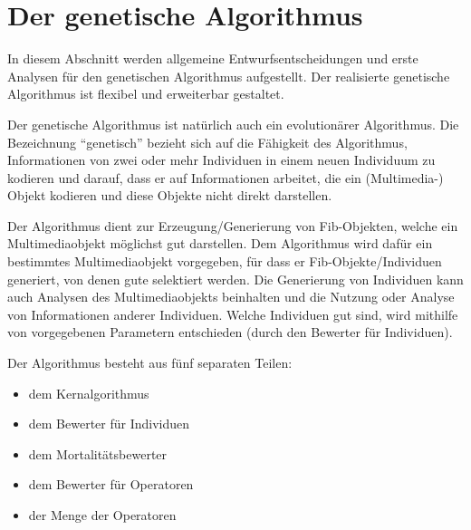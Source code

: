 %
%
%
%

\graphicspath{{./material_enviroment/}}
\graphicspath{{./material_enviroment/}{../material_enviroment}}

\newpage
\part{Der genetische Algorithmus}
\label{secGeneticAlgorithmDesign}

In diesem Abschnitt werden allgemeine Entwurfsentscheidungen und erste Analysen für den genetischen Algorithmus aufgestellt.
Der realisierte genetische Algorithmus ist flexibel und erweiterbar gestaltet.

Der genetische Algorithmus ist natürlich auch ein evolutionärer Algorithmus. Die Bezeichnung ``genetisch'' bezieht sich auf die Fähigkeit des Algorithmus, Informationen von zwei oder mehr Individuen in einem neuen Individuum zu kodieren und darauf, dass er auf Informationen arbeitet, die ein (Multimedia-) Objekt kodieren und diese Objekte nicht direkt darstellen.

Der Algorithmus dient zur Erzeugung/Generierung von Fib-Objekten, welche ein Multimediaobjekt möglichst gut darstellen. Dem Algorithmus wird dafür ein bestimmtes Multimediaobjekt vorgegeben, für dass er Fib-Objekte/Individuen generiert, von denen gute selektiert werden. Die Generierung von Individuen kann auch Analysen des Multimediaobjekts beinhalten und die Nutzung oder Analyse von Informationen anderer Individuen. Welche Individuen gut sind, wird mithilfe von vorgegebenen Parametern entschieden (durch den Bewerter für Individuen).

\bigskip\noindent
Der Algorithmus besteht aus fünf separaten Teilen:
\begin{itemize}
 \item dem Kernalgorithmus
 \item dem Bewerter für Individuen
 \item dem Mortalitätsbewerter
 \item dem Bewerter für Operatoren
 \item der Menge der Operatoren
\end{itemize}

